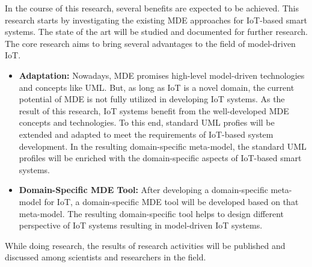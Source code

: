 In the course of this research, several benefits are expected to be achieved. This research starts by investigating the existing MDE approaches for IoT-based smart systems. The state of the art will be studied and documented for further research. The core research aims to bring several advantages to the field of model-driven IoT.
\begin{itemize}
\item \textbf{Adaptation:} Nowadays, MDE promises high-level model-driven technologies and concepts like UML. But, as long as IoT is a novel domain, the current potential of MDE is not fully utilized in developing IoT systems. As the result of this research, IoT systems benefit from the well-developed MDE concepts and technologies. To this end, standard UML profies will be extended and adapted to meet the requirements of IoT-based system development. In the resulting domain-specific meta-model, the standard UML profiles will be enriched with the domain-specific aspects of IoT-based smart systems.
\item \textbf{Domain-Specific MDE Tool:} After developing a domain-specific meta-model for IoT, a domain-specific MDE tool will be developed based on that meta-model. The resulting domain-specific tool helps to design different perspective of IoT systems resulting in model-driven IoT systems. 
\end{itemize}

While doing research, the results of research activities will be published and discussed among scientists and researchers in the field.